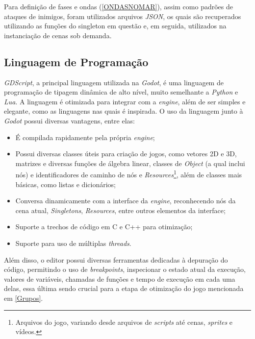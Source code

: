 Para definição de fases e ondas (\ref{ONDASNOMAR}), assim como padrões de ataques de inimigos, foram utilizados arquivos \textit{JSON}, os quais são recuperados utilizando as funções do singleton em questão e, em seguida, utilizados na instanciação de cenas sob demanda.

\subsection{Linguagem de Programação}

\textit{GDScript}, a principal linguagem utilizada na \textit{Godot}, é uma linguagem de programação de tipagem dinâmica de alto nível, muito semelhante a \textit{Python} e \textit{Lua}. A linguagem é otimizada para integrar com a \textit{engine}, além de ser simples e elegante, como as linguagens nas quais é inspirada. O uso da linguagem junto à \textit{Godot} possui diversas vantagens, entre elas:

\begin{itemize}
    \item É compilada rapidamente pela própria \textit{engine};
    \item Possui diversas classes úteis para criação de jogos, como vetores 2D e 3D, matrizes e diversas funções de álgebra linear, classes de \textit{Object} (a qual inclui nós) e identificadores de caminho de nós e \textit{Resources}\footnote{
        Arquivos do jogo, variando desde arquivos de \textit{scripts} até cenas, \textit{sprites} e vídeos.
    }, além de classes mais básicas, como listas e dicionários;
    \item Conversa dinamicamente com a interface da \textit{engine}, reconhecendo nós da cena atual, \textit{Singletons}, \textit{Resources}, entre outros elementos da interface;
    \item Suporte a trechos de código em C e C++ para otimização;
    \item Suporte para uso de múltiplas \textit{threads}.
\end{itemize}

Além disso, o editor possui diversas ferramentas dedicadas à depuração do código, permitindo o uso de \textit{breakpoints}, inspecionar o estado atual da execução, valores de variáveis, chamadas de funções e tempo de execução em cada uma delas, essa última sendo crucial para a etapa de otimização do jogo mencionada em \ref{Grupos}.